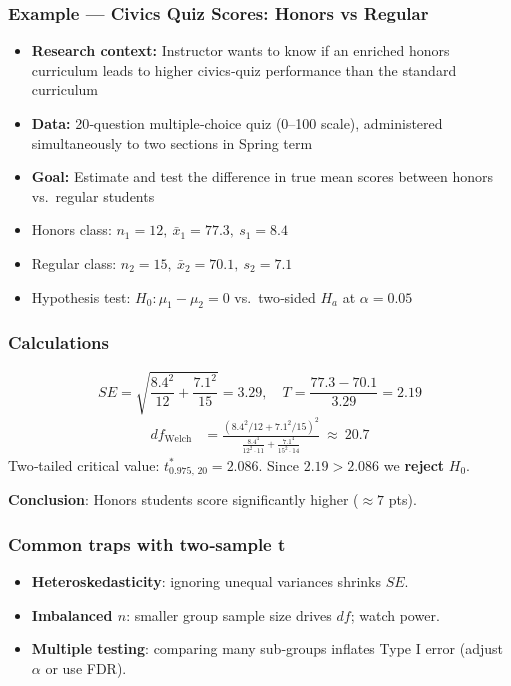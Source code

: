 \documentclass[handout]{beamer}
\begin{document}
\begin{frame}
\frametitle{Example — Civics Quiz Scores: Honors vs Regular}
\small
\begin{itemize}
    \item \textbf{Research context:} Instructor wants to know if an enriched honors curriculum leads to higher civics‐quiz performance than the standard curriculum
    \item \textbf{Data:} 20‐question multiple‐choice quiz (0–100 scale), administered simultaneously to two sections in Spring term
    \item \textbf{Goal:} Estimate and test the difference in true mean scores between honors vs.\ regular students
    \item Honors class: \(n_1=12,\ \bar x_1=77.3,\ s_1=8.4\)
    \item Regular class: \(n_2=15,\ \bar x_2=70.1,\ s_2=7.1\)
    \item Hypothesis test: \(H_0: \mu_1-\mu_2 = 0\) vs.\ two‑sided \(H_a\) at \(\alpha=0.05\)
\end{itemize}
\end{frame}


\begin{frame}
\frametitle{Calculations}

\[
SE=\sqrt{\frac{8.4^2}{12}+\frac{7.1^2}{15}}=3.29,
\quad T=\frac{77.3-70.1}{3.29}=2.19
\]
\vspace{-0.3em}
\begin{align*}
df_{\text{Welch}} &=
\frac{(8.4^2/12 + 7.1^2/15)^2}{\tfrac{8.4^4}{12^2\cdot11} + \tfrac{7.1^4}{15^2\cdot14}}
\ \approx\ 20.7
\end{align*}
Two‑tailed critical value: \(t^{\ast}_{0.975,\,20}=2.086\).
Since \(2.19>2.086\) we \textbf{reject} \(H_0\).
\vspace{0.3em}

\textbf{Conclusion}: Honors students score significantly higher ($\approx7$ pts).
\end{frame}

\begin{frame}
\frametitle{Common traps with two‑sample t}
\begin{itemize}
  \item \textbf{Heteroskedasticity}: ignoring unequal variances shrinks \(SE\).
  \item \textbf{Imbalanced $n$}: smaller group sample size drives \(df\); watch power.
  \item \textbf{Multiple testing}: comparing many sub‑groups inflates Type I error (adjust \(\alpha\) or use FDR).
\end{itemize}
\end{frame}
\end{document}
